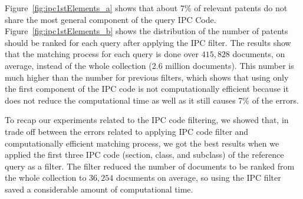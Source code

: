 Figure~\ref{fig:ipc1stElements_a} shows that about 7\% of relevant patents do not share the most general component of the query IPC Code. 
Figure~\ref{fig:ipc1stElements_b} shows the distribution of the number of patents should be ranked for each query after applying the IPC filter.
The results show that the matching process for each query is done over $ 415,828 $ documents, on average, instead of the whole collection (2.6 million documents). This number is much higher than the number for previous filters, which shows that using only the first component of the IPC code is not computationally efficient because it does not reduce the computational time as well as it still causes 7\% of the errors. 

To recap our experiments related to the IPC code filtering, we showed that, in trade off between the errors related to applying IPC code filter and computationally efficient matching process, we got the best results when we applied the first three IPC code (section, class, and subclass) of the reference query as a filter. The filter reduced the number of documents to be ranked from the whole collection to $ 36,254 $ documents on average, so using the IPC filter saved a considerable amount of computational time.